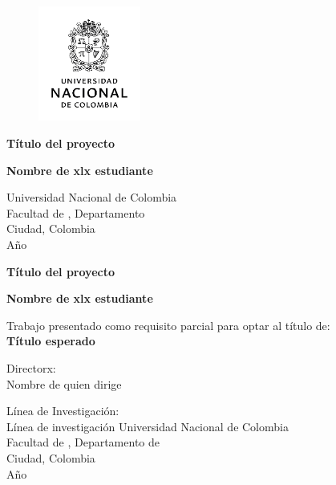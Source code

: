 
\begin{titlepage}
    \begin{center}
          
      	\begin{figure}[ht]
      		\includegraphics[width=0.3\textwidth]{images/preliminaries/EscudoUNAL.png}
      		\centering
      	\end{figure}
            
        \vspace{3.5cm}
            
        \LARGE{\textbf{Título del proyecto}}
        
        
        \vspace{3.5cm}
        \large{\textbf{Nombre de xlx estudiante}}
        \vfill
        
        
        \normalsize{Universidad Nacional de Colombia\\
					Facultad de , Departamento \\
					Ciudad, Colombia\\
					Año}
            
    \end{center}
\end{titlepage}
\let\cleardoublepage\clearpage
\begin{titlepage}
    \begin{center}            
        \LARGE{\textbf{Título del proyecto}}  
            
        \vspace{3.5cm}
        \large{\textbf{Nombre de xlx estudiante}}
            
        \vspace{3.5cm}
        \normalsize{Trabajo presentado como requisito parcial para optar al título de:\\
        \textbf{Título esperado}}    
     
        \vspace{2cm}
        \normalsize{Directorx:\\ Nombre de quien dirige}
        
        \vspace{1.2cm}
        \normalsize{L\'inea de Investigaci\'on:\\Línea de investigación}
        \vfill
		\normalsize{Universidad Nacional de Colombia\\
					Facultad de , Departamento de \\
					Ciudad, Colombia\\
					Año}
            
    \end{center}
\end{titlepage}
